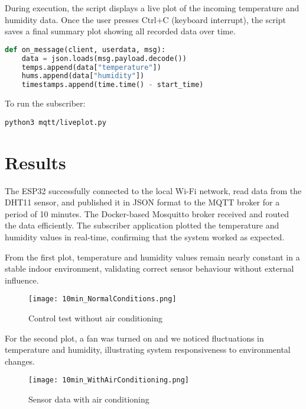 \documentclass[a4paper,12pt]{article}
\begin{document}
\newpage
\noindent During execution, the script displays a live plot of the incoming temperature and humidity data. Once the user presses Ctrl+C (keyboard interrupt), the script saves a final summary plot showing all recorded data over time.

\begin{lstlisting}[language=Python,caption=MQTT on\_message Callback]
def on_message(client, userdata, msg):
    data = json.loads(msg.payload.decode())
    temps.append(data["temperature"])
    hums.append(data["humidity"])
    timestamps.append(time.time() - start_time)
\end{lstlisting}

To run the subscriber:

\begin{verbatim}
python3 mqtt/liveplot.py
\end{verbatim}


\section{Results}
The ESP32 successfully connected to the local Wi-Fi network, read data from the DHT11 sensor, and published it in JSON format to the MQTT broker for a period of 10 minutes. The Docker-based Mosquitto broker received and routed the data efficiently. The subscriber application plotted the temperature and humidity values in real-time, confirming that the system worked as expected.

From the first plot, temperature and humidity values remain nearly constant in a stable indoor environment, validating correct sensor behaviour without external influence.
\begin{figure}[h!]
    \centering
    \texttt{[image: 10min\_NormalConditions.png]}
    \caption{Control test without air conditioning}
    \label{fig:enter-label}
\end{figure}
For the second plot, a fan was turned on and we noticed fluctuations in temperature and humidity, illustrating system responsiveness to environmental changes.
\begin{figure}[h!]
    \centering
    \texttt{[image: 10min\_WithAirConditioning.png]}
    \caption{Sensor data with air conditioning}
    \label{fig:enter-label}
\end{figure}
\end{document}
